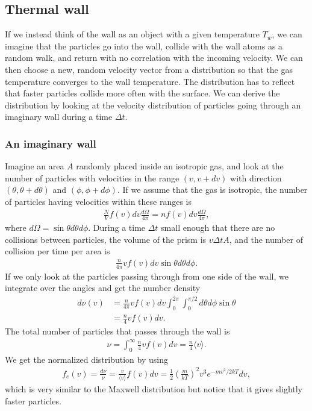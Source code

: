 \subsection{Thermal wall}
If we instead think of the wall as an object with a given temperature $T_w$, we can imagine that the particles go into the wall, collide with the wall atoms as a random walk, and return with no correlation with the incoming velocity. We can then choose a new, random velocity vector from a distribution so that the gas temperature converges to the wall temperature. The distribution has to reflect that faster particles collide more often with the surface. We can derive the distribution by looking at the velocity distribution of particles going through an imaginary wall during a time $\Delta t$.
\subsubsection{An imaginary wall}
Imagine an area $A$ randomly placed inside an isotropic gas, and look at the number of particles with velocities in the range $(v, v+dv)$ with direction $(\theta, \theta + d\theta)$ and $(\phi, \phi + d\phi)$. If we assume that the gas is isotropic, the number of particles having velocities within these ranges is 
\begin{align*}
	\frac{N}{V}f(v)dv \frac{d\Omega}{4\pi} = nf(v)dv \frac{d\Omega}{4\pi},
\end{align*}
where $d\Omega=\sin\theta d\theta d\phi$. During a time $\Delta t$ small enough that there are no collisions between particles, the volume of the prism is $v\Delta t A$, and the number of collision per time per area is 
\begin{align*}
	\frac{n}{4\pi} v f(v)dv \sin\theta d\theta d\phi.
\end{align*}
If we only look at the particles passing through from one side of the wall, we integrate over the angles and get the number density
\begin{align*}
	d\nu(v) &= \frac{n}{4\pi} v f(v)dv \int_0^{2\pi}\int_0^{\pi/2}d\theta d\phi \sin\theta\\
	&= \frac{n}{4} v f(v) dv.
\end{align*}
The total number of particles that passes through the wall is
\begin{align*}
	\nu = \int_0^\infty \frac{n}{4} v f(v) dv = \frac{n}{4} \langle v \rangle.
\end{align*}
We get the normalized distribution by using
\begin{align*}
	f_e(v) = \frac{d\nu}{\nu} = \frac{v}{\langle v \rangle} f(v) dv = \frac{1}{2} \left(\frac{m}{kT}\right)^2 v^3 e^{-mv^2/2kT}dv,
\end{align*}
which is very similar to the Maxwell distribution but notice that it gives slightly faster particles.

